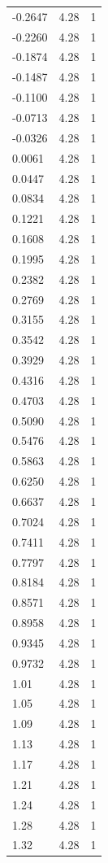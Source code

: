 \begin{longtable}{lrr}
  -0.2647 & 4.28 & 1 \\
  -0.2260 & 4.28 & 1 \\
  -0.1874 & 4.28 & 1 \\
  -0.1487 & 4.28 & 1 \\
  -0.1100 & 4.28 & 1 \\
  -0.0713 & 4.28 & 1 \\
  -0.0326 & 4.28 & 1 \\
  0.0061 & 4.28 & 1 \\
  0.0447 & 4.28 & 1 \\
  0.0834 & 4.28 & 1 \\
  0.1221 & 4.28 & 1 \\
  0.1608 & 4.28 & 1 \\
  0.1995 & 4.28 & 1 \\
  0.2382 & 4.28 & 1 \\
  0.2769 & 4.28 & 1 \\
  0.3155 & 4.28 & 1 \\
  0.3542 & 4.28 & 1 \\
  0.3929 & 4.28 & 1 \\
  0.4316 & 4.28 & 1 \\
  0.4703 & 4.28 & 1 \\
  0.5090 & 4.28 & 1 \\
  0.5476 & 4.28 & 1 \\
  0.5863 & 4.28 & 1 \\
  0.6250 & 4.28 & 1 \\
  0.6637 & 4.28 & 1 \\
  0.7024 & 4.28 & 1 \\
  0.7411 & 4.28 & 1 \\
  0.7797 & 4.28 & 1 \\
  0.8184 & 4.28 & 1 \\
  0.8571 & 4.28 & 1 \\
  0.8958 & 4.28 & 1 \\
  0.9345 & 4.28 & 1 \\
  0.9732 & 4.28 & 1 \\
  1.01 & 4.28 & 1 \\
  1.05 & 4.28 & 1 \\
  1.09 & 4.28 & 1 \\
  1.13 & 4.28 & 1 \\
  1.17 & 4.28 & 1 \\
  1.21 & 4.28 & 1 \\
  1.24 & 4.28 & 1 \\
  1.28 & 4.28 & 1 \\
  1.32 & 4.28 & 1 \\

\end{longtable}
